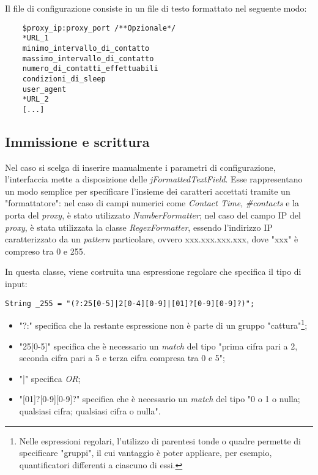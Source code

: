 Il file di configurazione consiste in un file di testo formattato nel seguente modo:

\vspace{0.5cm}
\begin{lstlisting}
	$proxy_ip:proxy_port /**Opzionale*/
	*URL_1
	minimo_intervallo_di_contatto
	massimo_intervallo_di_contatto
	numero_di_contatti_effettuabili
	condizioni_di_sleep
	user_agent
	*URL_2
	[...]
\end{lstlisting}

\subsection{Immissione e scrittura}
Nel caso si scelga di inserire manualmente i parametri di configurazione, l'interfaccia mette a disposizione delle \textit{jFormattedTextField}. Esse rappresentano un modo semplice per specificare l'insieme dei caratteri accettati tramite un "formattatore": nel caso di campi numerici come \textit{Contact Time}, \textit{\#contacts} e la porta del \textit{proxy}, \`{e} stato utilizzato \textit{NumberFormatter}; nel caso del campo IP del \textit{proxy}, \`{e} stata utilizzata la classe \textit{RegexFormatter}, essendo l'indirizzo IP caratterizzato da un \textit{pattern} particolare, ovvero xxx.xxx.xxx.xxx, dove "xxx" \`{e} compreso tra 0 e 255.

In questa classe, viene costruita una espressione regolare che specifica il tipo di input:

\vspace{0.5cm}
\begin{lstlisting}
String _255 = "(?:25[0-5]|2[0-4][0-9]|[01]?[0-9][0-9]?)";
\end{lstlisting}

\begin{itemize}
	\item "?:" specifica che la restante espressione non \`{e} parte di un gruppo "cattura"\footnote{Nelle espressioni regolari, l'utilizzo di parentesi tonde o quadre permette di specificare "gruppi", il cui vantaggio \`{e} poter applicare, per esempio, quantificatori differenti a ciascuno di essi.};
	\item "25[0-5]" specifica che \`{e} necessario un \textit{match} del tipo "prima cifra pari a 2, seconda cifra pari a 5 e terza cifra compresa tra 0 e 5";
	\item "|" specifica \textit{OR};
	\item "[01]?[0-9][0-9]?" specifica che \`{e} necessario un \textit{match} del tipo "0 o 1 o nulla; qualsiasi cifra; qualsiasi cifra o nulla".
\end{itemize}

